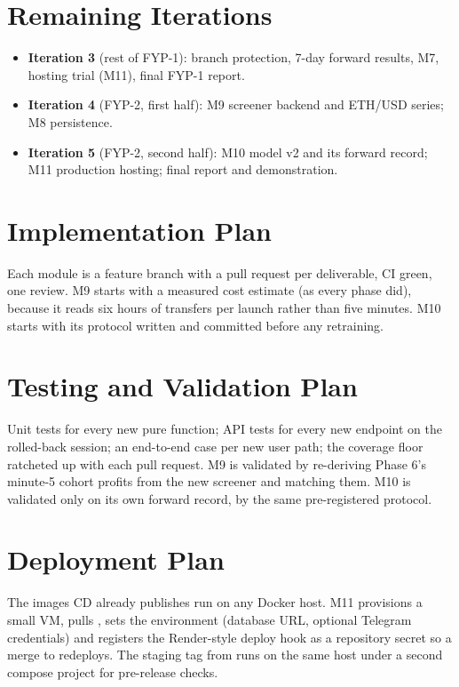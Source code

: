 \section{Remaining Iterations}
\begin{itemize}
  \item \textbf{Iteration 3} (rest of FYP-1): branch protection, 7-day forward results, M7, hosting trial (M11), final FYP-1 report.
  \item \textbf{Iteration 4} (FYP-2, first half): M9 screener backend and ETH/USD series; M8 persistence.
  \item \textbf{Iteration 5} (FYP-2, second half): M10 model v2 and its forward record; M11 production hosting; final report and demonstration.
\end{itemize}

\section{Implementation Plan}
Each module is a feature branch with a pull request per deliverable, CI green, one review. M9 starts with a measured cost estimate (as every phase did), because it reads six hours of transfers per launch rather than five minutes. M10 starts with its protocol written and committed before any retraining.

\section{Testing and Validation Plan}
Unit tests for every new pure function; API tests for every new endpoint on the rolled-back session; an end-to-end case per new user path; the coverage floor ratcheted up with each pull request. M9 is validated by re-deriving Phase 6's minute-5 cohort profits from the new screener and matching them. M10 is validated only on its own forward record, by the same pre-registered protocol.

\section{Deployment Plan}
The images CD already publishes run on any Docker host. M11 provisions a small VM, pulls , sets the environment (database URL, optional Telegram credentials) and registers the Render-style deploy hook as a repository secret so a merge to  redeploys. The staging tag from  runs on the same host under a second compose project for pre-release checks.

